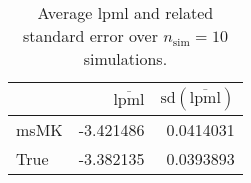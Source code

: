 \begin{table}[H]

\caption{Average lpml and related standard error over $n_{\text{sim}} = 10$ simulations.}
\centering
\begin{tabular}[t]{lrr}
\toprule
  & $\overbar{\text{lpml}}$ & $\text{sd}(\overbar{\text{lpml}})$\\
\midrule
msMK & -3.421486 & 0.0414031\\
True & -3.382135 & 0.0393893\\
\bottomrule
\end{tabular}
\end{table}
